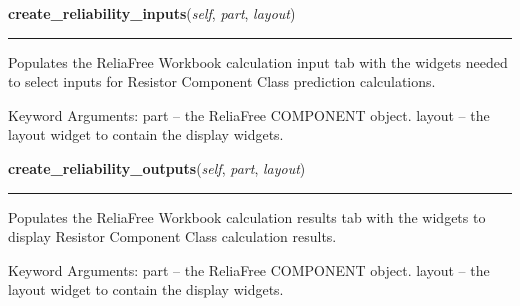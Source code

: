     \label{reliafree:resistors:resistor:Resistor:create_reliability_inputs}

    \vspace{0.5ex}

\hspace{.8\funcindent}\begin{boxedminipage}{\funcwidth}

    \raggedright \textbf{create\_reliability\_inputs}(\textit{self}, \textit{part}, \textit{layout})

    \vspace{-1.5ex}

    \rule{\textwidth}{0.5\fboxrule}
\setlength{\parskip}{2ex}
    Populates the ReliaFree Workbook calculation input tab with the widgets
    needed to select inputs for Resistor Component Class prediction 
    calculations.

    Keyword Arguments: part   -- the ReliaFree COMPONENT object. layout -- 
    the layout widget to contain the display widgets.

\setlength{\parskip}{1ex}
    \end{boxedminipage}

    \label{reliafree:resistors:resistor:Resistor:create_reliability_outputs}

    \vspace{0.5ex}

\hspace{.8\funcindent}\begin{boxedminipage}{\funcwidth}

    \raggedright \textbf{create\_reliability\_outputs}(\textit{self}, \textit{part}, \textit{layout})

    \vspace{-1.5ex}

    \rule{\textwidth}{0.5\fboxrule}
\setlength{\parskip}{2ex}
    Populates the ReliaFree Workbook calculation results tab with the 
    widgets to display Resistor Component Class calculation results.

    Keyword Arguments: part   -- the ReliaFree COMPONENT object. layout -- 
    the layout widget to contain the display widgets.

\setlength{\parskip}{1ex}
    \end{boxedminipage}

